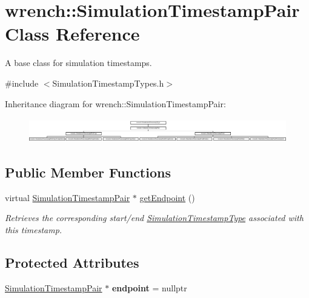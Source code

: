 \hypertarget{classwrench_1_1_simulation_timestamp_pair}{}\section{wrench\+:\+:Simulation\+Timestamp\+Pair Class Reference}
\label{classwrench_1_1_simulation_timestamp_pair}


A base class for simulation timestamps.  




{\ttfamily \#include $<$Simulation\+Timestamp\+Types.\+h$>$}

Inheritance diagram for wrench\+:\+:Simulation\+Timestamp\+Pair\+:\begin{figure}[H]
\begin{center}
\leavevmode
\includegraphics[height=1.081081cm]{classwrench_1_1_simulation_timestamp_pair}
\end{center}
\end{figure}
\subsection*{Public Member Functions}
\begin{DoxyCompactItemize}
\item 
virtual \hyperlink{classwrench_1_1_simulation_timestamp_pair}{Simulation\+Timestamp\+Pair} $\ast$ \hyperlink{classwrench_1_1_simulation_timestamp_pair_aa47d05297b863c29179a505ea4e5dfdf}{get\+Endpoint} ()
\begin{DoxyCompactList}\small\item\em Retrieves the corresponding start/end \hyperlink{classwrench_1_1_simulation_timestamp_type}{Simulation\+Timestamp\+Type} associated with this timestamp. \end{DoxyCompactList}\end{DoxyCompactItemize}
\subsection*{Protected Attributes}
\begin{DoxyCompactItemize}
\item 
\mbox{\label{classwrench_1_1_simulation_timestamp_pair_ab0bbbd2bd759db2a86a9f7857c4de2f8}} 
\hyperlink{classwrench_1_1_simulation_timestamp_pair}{Simulation\+Timestamp\+Pair} $\ast$ {\bfseries endpoint} = nullptr
\end{DoxyCompactItemize}


